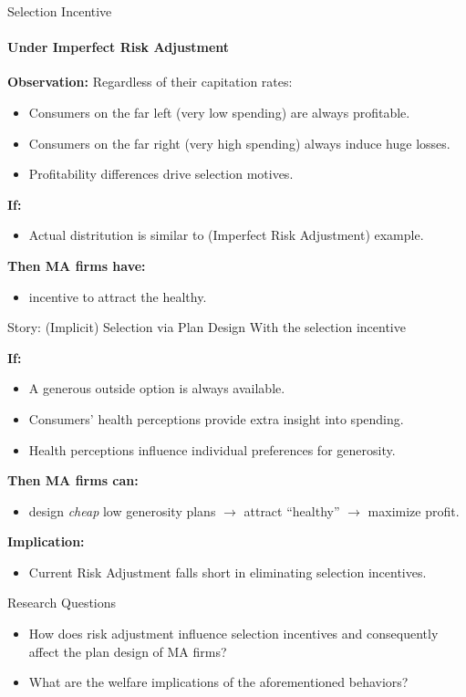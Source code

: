 \begin{frame}{Selection Incentive}
    \framesubtitle{Under Imperfect Risk Adjustment}
    \textbf{Observation:} Regardless of their capitation rates:
    \begin{itemize}
        \item Consumers on the far left (very low spending) are always profitable.
        \item Consumers on the far right (very high spending) always induce huge losses.
        \item Profitability differences drive selection motives.
    \end{itemize}
    
    \vfill 

    \textbf{If:} 
    \begin{itemize}
        \item \textcolor{structure}{Actual distritution is similar to (Imperfect Risk Adjustment) example.} 
    \end{itemize}

    \textbf{Then MA firms have:} 
    \begin{itemize}
        \item  incentive to attract the healthy. 
    \end{itemize}
\end{frame}

\begin{frame}{Story: (Implicit) Selection via Plan Design}
    With the selection incentive

    \textbf{If:} 
    \begin{itemize}
        \item \textcolor{structure}{A generous outside option is always available.}
        \item \textcolor{structure}{Consumers' health perceptions provide extra insight into spending.}
        \item \textcolor{structure}{Health perceptions influence individual preferences for generosity.}
    \end{itemize}
    
    \textbf{Then MA firms can:} 
    \begin{itemize}
        \item  design \textit{cheap} low generosity plans $\rightarrow$ attract ``healthy'' $\rightarrow$ maximize profit.
    \end{itemize}

    \vfill
    \pause
    \textbf{Implication:}
    \begin{itemize}
        \item Current Risk Adjustment falls short in eliminating selection incentives.
    \end{itemize}
    \renewcommand*{\thefootnote}{}
\end{frame}


\begin{frame}{Research Questions}
    \begin{itemize}
        \item How does risk adjustment influence selection incentives and consequently affect the plan design of MA firms?
        

        \item What are the welfare implications of the aforementioned behaviors?

    \end{itemize}
\end{frame}